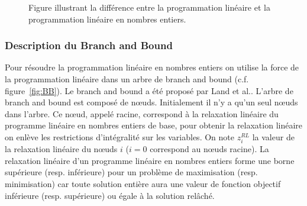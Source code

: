 \begin{figure}
[H]
\centering
{}
\caption{Figure illustrant la différence entre la programmation linéaire et la programmation linéaire en nombres entiers. \label{fig:PL_PLNE}}
\end{figure}


\subsubsection{Description du Branch and Bound}
Pour résoudre la programmation linéaire en nombres entiers on utilise la force de la programmation linéaire dans un arbre de branch and bound (c.f. figure~\ref{fig:BB}).
Le branch and bound a été proposé par Land et al.\cite{land1960automatic}.
L'arbre de branch and bound est composé de nœuds.
Initialement il n'y a qu'un seul n\oe uds dans l'arbre.
Ce n\oe ud, appelé racine, correspond à la relaxation linéaire du programme linéaire en nombres entiers de base, pour obtenir la relaxation linéaire on enlève les restrictions d'intégralité sur les variables.
On note $z_i^{RL}$ la valeur de la relaxation linéaire du n\oe uds $i$ ($i=0$ correspond au n\oe uds racine).
La relaxation linéaire d'un programme linéaire en nombres entiers forme une borne supérieure (resp. inférieure) pour un problème de maximisation (resp. minimisation) car toute solution entière aura une valeur de fonction objectif inférieure (resp. supérieure) ou égale à la solution relâché.

